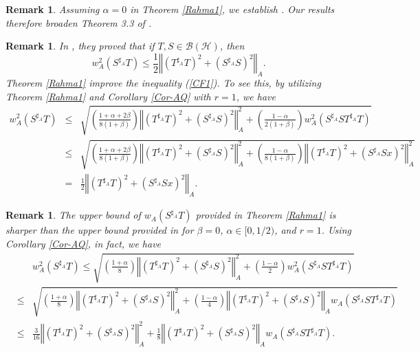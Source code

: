 \documentclass{article}
\newcommand{\bra}[1]{\left(#1\right)}
\newcommand{\normA}[1]{{\left\Vert#1\right\Vert}_{A}}
\newcommand {\bh}{\mathcal{B}(\mathcal{H})}
\newcommand {\Sa}{S^{\sharp_{A}}}
\newcommand {\Ta}{T^{\sharp_{A}}}
\newtheorem{remark}[theorem]{Remark}
\begin{document}
\begin{remark}Assuming $\alpha=0$ in Theorem \ref{Rahma1}, we establish \cite[Theorem 3.3]{QHC}. Our results therefore broaden Theorem 3.3 of \cite{QHC}.
\end{remark}
\begin{remark} In \cite[Theorem 2.7]{CF}, they proved that if $T,S\in\bh$, then
\begin{equation}\label{CF1}
  w_A^2(\Sa T)\leq \frac{1}{2}\normA{(\Ta T)^2+(\Sa S)^2}.
\end{equation}
 Theorem \ref{Rahma1} improve the inequality (\ref{CF1}). To see this, by utilizing Theorem \ref{Rahma1} and Corollary
 \ref{Cor-AQ}  with $r=1$, we have
 \begin{eqnarray*}
   w_A^{2}(\Sa T) &\leq&\sqrt{\bra{\frac{1+\alpha+2\beta}{8(1+\beta)}}\normA{\bra{\Ta T}^{2}+\bra{\Sa S}^{2}}^2+\bra{\frac{1-\alpha}{2(1+\beta)}}w_A^{2}(\Sa S\Ta T)} \\
    &\leq&\sqrt{\bra{\frac{1+\alpha+2\beta}{8(1+\beta)}}\normA{\bra{\Ta T}^{2}+\bra{\Sa S}^{2}}^2+
    \bra{\frac{1-\alpha}{8(1+\beta)}}\normA{\bra{\Ta T}^{2}+\bra{\Sa Sx}^{2}}^2}\\
    &=& \frac{1}{2}\normA{\bra{\Ta T}^{2}+\bra{\Sa Sx}^{2}}.
 \end{eqnarray*}
\end{remark}
\begin{remark} The upper bound of $w_A(\Sa T)$ provided in Theorem \ref{Rahma1} is sharper than the upper bound provided in \cite[Theorem 3.8]{QHB} for $\beta=0$, $\alpha\in [0,1/2)$, and $r=1$. Using Corollary \ref{Cor-AQ}, in fact, we have
\begin{eqnarray*}
  &&w_A^2(\Sa T)\leq \sqrt{\bra{\frac{1+\alpha}{8}}\normA{\bra{\Ta T}^{2}+\bra{\Sa S}^{2}}^2+\bra{\frac{1-\alpha}{2}}w_A^{2}(\Sa S\Ta T)} \\
   &\leq&\sqrt{\bra{\frac{1+\alpha}{8}}\normA{\bra{\Ta T}^{2}+\bra{\Sa S}^{2}}^2
   +\bra{\frac{1-\alpha}{4}}\normA{\bra{\Ta T}^{2}+\bra{\Sa S}^{2}}w_A(\Sa S\Ta T)} \\
   &\leq& \frac{3}{16}\normA{\bra{\Ta T}^{2}+\bra{\Sa S}^{2}}^2+\frac{1}{8}\normA{\bra{\Ta T}^{2}+\bra{\Sa S}^{2}}w_A(\Sa S\Ta T).
\end{eqnarray*}
\end{remark}
\end{document}
